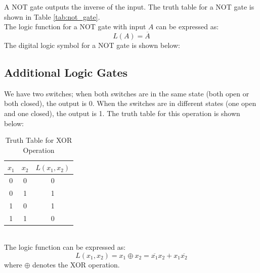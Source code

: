 \documentclass[11pt]{report}
\begin{document}
\begin{definition}
    A NOT gate outputs the inverse of the input. The truth table for a NOT gate is shown in Table \ref{tab:not_gate}.
    \\
    The logic function for a NOT gate with input $A$ can be expressed as:
    $$
        L(A) = \overline{A}
    $$
    The digital logic symbol for a NOT gate is shown below:
    \begin{center}
    \end{center}
\end{definition}


\subsection{Additional Logic Gates}
\begin{example}
    We have two switches; when both switches are in the same state (both open or both closed), the output is 0. When the switches are in different states (one open and one closed), the output is 1. The truth table for this operation is shown below:
    \begin{table}[h!]
        \centering
        \begin{tabular}{|c|c|c|}      
            \hline
            $x_1$ & $x_2$ & $L(x_1, x_2)$ \\
            \hline
            0 & 0 & 0 \\
            0 & 1 & 1 \\
            1 & 0 & 1 \\
            1 & 1 & 0 \\
            \hline
        \end{tabular}
        \caption{Truth Table for XOR Operation}
        \label{tab:xor_gate}
    \end{table}
    \\
    The logic function can be expressed as:
    $$
        L(x_1, x_2) = x_1 \oplus x_2 = \overline{x_1}x_2 + x_1\overline{x_2}
    $$
    where $\oplus$ denotes the XOR operation.
\end{example}
\end{document}
